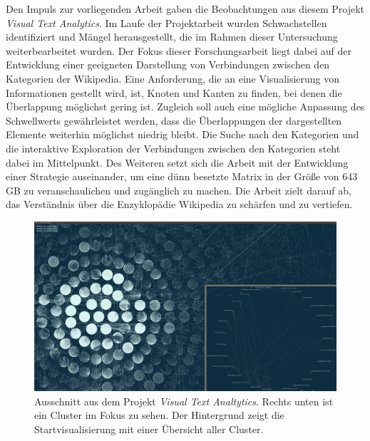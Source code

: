 Den Impuls zur vorliegenden Arbeit gaben die Beobachtungen aus diesem Projekt \emph{Visual Text Analytics}.
Im Laufe der Projektarbeit wurden Schwachstellen identifiziert und Mängel herausgestellt, die im Rahmen dieser Untersuchung weiterbearbeitet wurden.
Der Fokus dieser Forschungsarbeit liegt dabei auf der Entwicklung einer geeigneten Darstellung von Verbindungen zwischen den Kategorien der Wikipedia.
Eine Anforderung, die an eine Visualisierung von Informationen gestellt wird, ist, Knoten und Kanten zu finden, bei denen die Überlappung möglichst gering ist. Zugleich soll auch eine mögliche Anpassung des Schwellwerts gewährleistet werden, dass die Überlappungen der dargestellten Elemente weiterhin möglichst niedrig bleibt.
Die Suche nach den Kategorien und die interaktive Exploration der Verbindungen zwischen den Kategorien steht dabei im Mittelpunkt.
Des Weiteren setzt sich die Arbeit mit der Entwicklung einer Strategie auseinander, um eine dünn besetzte Matrix in der Größe von 643 GB zu veranschaulichen und zugänglich zu machen.
Die Arbeit zielt darauf ab, das Verständnis über die Enzyklopädie Wikipedia zu schärfen und zu vertiefen.


\begin{figure}
\centering
\includegraphics[width=\textwidth]{images/01_introduction/vta-cover.png}
\caption{Ausschnitt aus dem Projekt \textit{Visual Text Analtytics}. Rechts unten ist ein Cluster im Fokus zu sehen. Der Hintergrund zeigt die Startvisualisierung mit einer Übersicht aller Cluster.}
\label{fig:vta-cover}
\end{figure}

